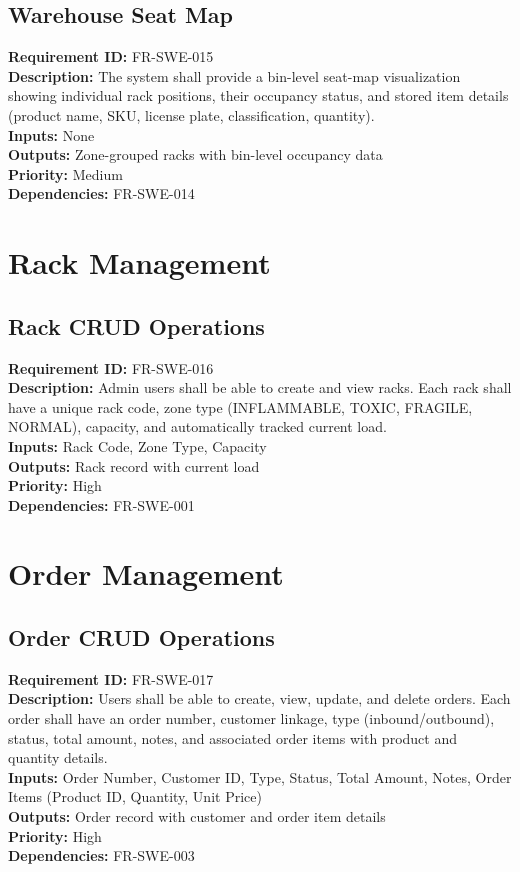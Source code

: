 \documentclass[12pt,a4paper]{report}
\begin{document}
\subsection{Warehouse Seat Map}
\noindent\textbf{Requirement ID:} FR-SWE-015\\
\textbf{Description:} The system shall provide a bin-level seat-map visualization showing individual rack positions, their occupancy status, and stored item details (product name, SKU, license plate, classification, quantity).\\
\textbf{Inputs:} None\\
\textbf{Outputs:} Zone-grouped racks with bin-level occupancy data\\
\textbf{Priority:} Medium\\
\textbf{Dependencies:} FR-SWE-014

\section{Rack Management}

\subsection{Rack CRUD Operations}
\noindent\textbf{Requirement ID:} FR-SWE-016\\
\textbf{Description:} Admin users shall be able to create and view racks. Each rack shall have a unique rack code, zone type (INFLAMMABLE, TOXIC, FRAGILE, NORMAL), capacity, and automatically tracked current load.\\
\textbf{Inputs:} Rack Code, Zone Type, Capacity\\
\textbf{Outputs:} Rack record with current load\\
\textbf{Priority:} High\\
\textbf{Dependencies:} FR-SWE-001

\section{Order Management}

\subsection{Order CRUD Operations}
\noindent\textbf{Requirement ID:} FR-SWE-017\\
\textbf{Description:} Users shall be able to create, view, update, and delete orders. Each order shall have an order number, customer linkage, type (inbound/outbound), status, total amount, notes, and associated order items with product and quantity details.\\
\textbf{Inputs:} Order Number, Customer ID, Type, Status, Total Amount, Notes, Order Items (Product ID, Quantity, Unit Price)\\
\textbf{Outputs:} Order record with customer and order item details\\
\textbf{Priority:} High\\
\textbf{Dependencies:} FR-SWE-003
\end{document}
